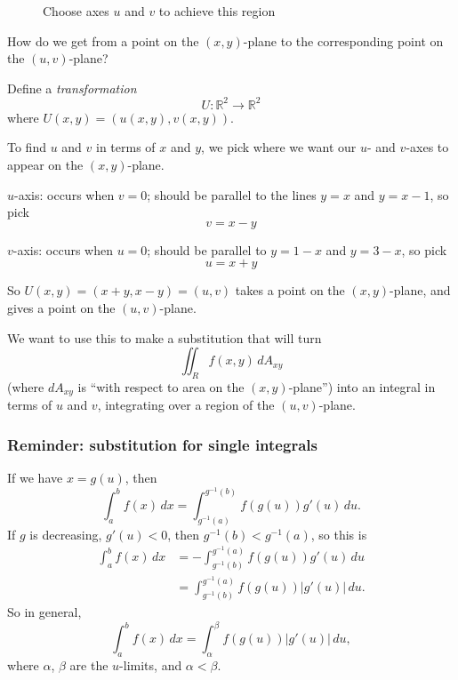   \begin{figure}[H]
    \centering
    \def\svgwidth{0.6\columnwidth}
    
    \caption{Choose axes $u$ and $v$ to achieve this region}
    \label{regnew}
  \end{figure}

  How do we get from a point on the $(x, y)$-plane to the corresponding point on the $(u, v)$-plane?

  Define a \emph{transformation}
    \[
      U \colon \mathbb{R}^2 \longrightarrow \mathbb{R}^2
    \]
  where $U(x, y) = (u(x, y), v(x, y))$.

  To find $u$ and $v$ in terms of $x$ and $y$, we pick where we want our $u$- and $v$-axes to appear on the $(x, y)$-plane.

  $u$-axis: occurs when $v = 0$; should be parallel to the lines $y = x$ and $y = x - 1$, so pick
    \[
      v = x - y
    \]

  $v$-axis: occurs when $u = 0$; should be parallel to $y = 1 - x$ and $y = 3 - x$, so pick
    \[
      u = x + y
    \]

  So $U(x, y) = (x + y, x - y) = (u, v)$ takes a point on the $(x, y)$-plane, and gives a point on the $(u, v)$-plane.

  We want to use this to make a substitution that will turn
    \[
      \iint_R f(x, y) \, dA_{xy}
    \]
  (where $dA_{xy}$ is ``with respect to area on the $(x, y)$-plane'') into an integral in terms of $u$ and $v$, integrating over a region of the $(u, v)$-plane.

  \subsubsection*{Reminder: substitution for single integrals}

  If we have $x = g(u)$, then
    \[
      \int_a^b f(x) \, dx = \int_{g^{-1}(a)}^{g^{-1}(b)} f(g(u))g'(u) \, du.
    \]
  If $g$ is decreasing, $g'(u) < 0$, then $g^{-1}(b) < g^{-1}(a)$, so this is
    \begin{align*}
      \int_a^b f(x) \, dx & = - \int_{g^{-1}(b)}^{g^{-1}(a)} f(g(u))g'(u) \, du  \\
      & = \int_{g^{-1}(b)}^{g^{-1}(a)} f(g(u))\left|g'(u)\right| \, du.
    \end{align*}
  So in general,
    \[
      \int_a^b f(x) \, dx = \int_{\alpha}^{\beta} f(g(u))\left|g'(u)\right| \, du,
    \]
  where $\alpha$, $\beta$ are the $u$-limits, and $\alpha < \beta$.


